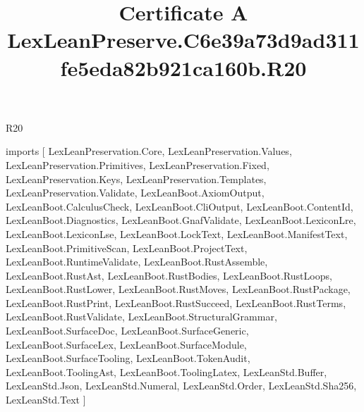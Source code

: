 \begin{lexlean}{R20}
\title{Certificate A LexLeanPreserve.C6e39a73d9ad311fe5eda82b921ca160b.R20}
\begin{coremodule}
imports [
  LexLeanPreservation.Core,
  LexLeanPreservation.Values,
  LexLeanPreservation.Primitives,
  LexLeanPreservation.Fixed,
  LexLeanPreservation.Keys,
  LexLeanPreservation.Templates,
  LexLeanPreservation.Validate,
  LexLeanBoot.AxiomOutput,
  LexLeanBoot.CalculusCheck,
  LexLeanBoot.CliOutput,
  LexLeanBoot.ContentId,
  LexLeanBoot.Diagnostics,
  LexLeanBoot.GnafValidate,
  LexLeanBoot.LexiconLre,
  LexLeanBoot.LexiconLse,
  LexLeanBoot.LockText,
  LexLeanBoot.ManifestText,
  LexLeanBoot.PrimitiveScan,
  LexLeanBoot.ProjectText,
  LexLeanBoot.RuntimeValidate,
  LexLeanBoot.RustAssemble,
  LexLeanBoot.RustAst,
  LexLeanBoot.RustBodies,
  LexLeanBoot.RustLoops,
  LexLeanBoot.RustLower,
  LexLeanBoot.RustMoves,
  LexLeanBoot.RustPackage,
  LexLeanBoot.RustPrint,
  LexLeanBoot.RustSucceed,
  LexLeanBoot.RustTerms,
  LexLeanBoot.RustValidate,
  LexLeanBoot.StructuralGrammar,
  LexLeanBoot.SurfaceDoc,
  LexLeanBoot.SurfaceGeneric,
  LexLeanBoot.SurfaceLex,
  LexLeanBoot.SurfaceModule,
  LexLeanBoot.SurfaceTooling,
  LexLeanBoot.TokenAudit,
  LexLeanBoot.ToolingAst,
  LexLeanBoot.ToolingLatex,
  LexLeanStd.Buffer,
  LexLeanStd.Json,
  LexLeanStd.Numeral,
  LexLeanStd.Order,
  LexLeanStd.Sha256,
  LexLeanStd.Text
]


\end{coremodule}
\end{lexlean}
